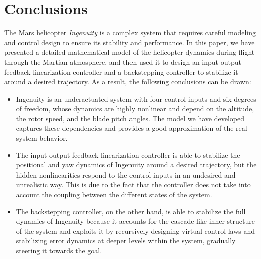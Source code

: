 \section{Conclusions}
The Mars helicopter \textit{Ingenuity} is a complex system that requires careful modeling and control design to ensure its stability and performance. In this paper, we have presented a detailed mathematical model of the helicopter dynamics during flight through the Martian atmosphere, and then used it to design an input-output feedback linearization controller and a backstepping controller to stabilize it around a desired trajectory. As a result, the following conclusions can be drawn:
\begin{itemize}
    \item Ingenuity is an underactuated system with four control inputs and six degrees of freedom, whose dynamics are highly nonlinear and depend on the altitude, the rotor speed, and the blade pitch angles. The model we have developed captures these dependencies and provides a good approximation of the real system behavior.
    \item The input-output feedback linearization controller is able to stabilize the positional and yaw dynamics of Ingenuity around a desired trajectory, but the hidden nonlinearities respond to the control inputs in an undesired and unrealistic way. This is due to the fact that the controller does not take into account the coupling between the different states of the system.
    \item The backstepping controller, on the other hand, is able to stabilize the full dynamics of Ingenuity because it accounts for the cascade-like inner structure of the system and exploits it by recursively designing virtual control laws and stabilizing error dynamics at deeper levels within the system, gradually steering it towards the goal.
\end{itemize}